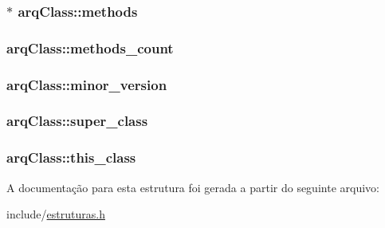 \subsubsection[{\texorpdfstring{methods}{methods}}]{$\ast$ arq\+Class\+::methods}\hypertarget{structarq_class_a849a70430b6245a2cc8b43a2516c5f00}{}\label{structarq_class_a849a70430b6245a2cc8b43a2516c5f00}
\subsubsection[{\texorpdfstring{methods\+\_\+count}{methods_count}}]{ arq\+Class\+::methods\+\_\+count}\hypertarget{structarq_class_a0cdd803ff7b2a6a229c048bb51f1febc}{}\label{structarq_class_a0cdd803ff7b2a6a229c048bb51f1febc}
\subsubsection[{\texorpdfstring{minor\+\_\+version}{minor_version}}]{ arq\+Class\+::minor\+\_\+version}\hypertarget{structarq_class_a90b447e4eea035e1dd5fb45360a6a09f}{}\label{structarq_class_a90b447e4eea035e1dd5fb45360a6a09f}
\subsubsection[{\texorpdfstring{super\+\_\+class}{super_class}}]{ arq\+Class\+::super\+\_\+class}\hypertarget{structarq_class_a7bd81d496166908031c40895ed667ada}{}\label{structarq_class_a7bd81d496166908031c40895ed667ada}
\subsubsection[{\texorpdfstring{this\+\_\+class}{this_class}}]{ arq\+Class\+::this\+\_\+class}\hypertarget{structarq_class_a0fa1b4b35fcc35e25fff7563f1ce7b2b}{}\label{structarq_class_a0fa1b4b35fcc35e25fff7563f1ce7b2b}


A documentação para esta estrutura foi gerada a partir do seguinte arquivo\+:\begin{DoxyCompactItemize}
\item 
include/\hyperlink{estruturas_8h}{estruturas.\+h}\end{DoxyCompactItemize}
